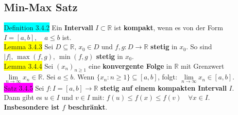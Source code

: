 \documentclass[landscape, 10pt]{article}
\newcommand{\R}{\mathbb{R}}
\begin{document}
\begin{multicols}{3}
       \subsection{Min-Max Satz}
              \colorbox{cyan}{Definition 3.4.2}
                     Ein \textbf{Intervall} $I\subset\R$ ist 
                     \textbf{kompakt}, wenn es 
                     von der Form 
                     \textcolor{NavyBlue}{$I=[a,b],\quad a\leqslant b$} ist.\\
              \colorbox{yellow}{Lemma 3.4.3} 
                     Sei \textcolor{NavyBlue}{$D\subseteq\R,\,x_0\in D$} und 
                     \textcolor{NavyBlue}{$f,g:D\longrightarrow\R$} 
                     \textbf{stetig} in \textcolor{NavyBlue}{$x_0$}. So sind 
                     \textcolor{NavyBlue}{
                     $|f|,\,\max(f,g),\,\min(f,g)$} \textbf{stetig} in 
                     \textcolor{NavyBlue}{$x_0$}.\\
              \colorbox{yellow}{Lemma 3.4.4} 
                     Sei \textcolor{NavyBlue}{$(x_n)_{n\geqslant1}$}
                     eine \textbf{konvergente Folge} in 
                     $\R$ mit Grenzwert 
                     \textcolor{NavyBlue}{$\lim\limits_{n\to\infty}x_n\in\R$}. 
                     Sei \textcolor{NavyBlue}{$a\leqslant b$}. 
                     Wenn \textcolor{NavyBlue}{$\{x_n:n\geqslant1\}\subseteq[a,b]$}, folgt: 
                     \textcolor{NavyBlue}{
                     $\lim\limits_{n\to\infty}x_n\in[a,b]$}. \\
              \colorbox{magenta}{Satz 3.4.5} Sei \textcolor{NavyBlue}{$f:I=[a,b]\longrightarrow\R$}
                     \textbf{stetig auf einem kompakten Intervall} \textcolor{NavyBlue}{$I$}. 
                     Dann gibt es \textcolor{NavyBlue}{$u\in I$} und 
                     \textcolor{NavyBlue}{$v\in I$} mit: 
                     \textcolor{NavyBlue}{
                     $f(u)\leqslant f(x)\leqslant f(v)\quad\forall x\in I$}. 
                     \textbf{Insbesondere ist 
                     \textcolor{NavyBlue}{$f$} beschränkt}.

\end{multicols}
\end{document}
